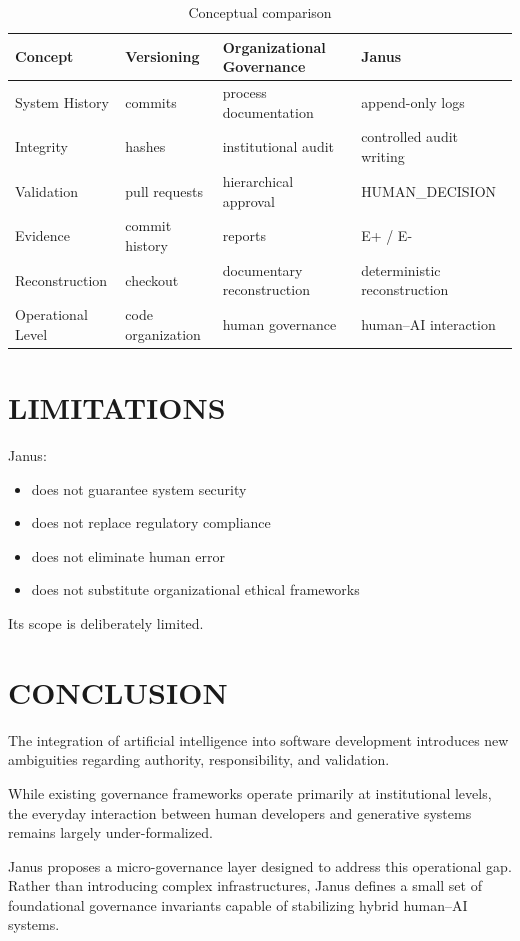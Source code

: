 \documentclass[conference]{IEEEtran}
\begin{document}
\begin{table}[ht]
\caption{Conceptual comparison}
\label{tab:comparison}
\centering
\setlength{\tabcolsep}{3pt}
\renewcommand{\arraystretch}{1.05}
\begin{tabularx}{\columnwidth}{l X X X}
\hline
Concept & Versioning & Organizational Governance & Janus \\
\hline
System History & commits & process documentation & append-only logs \\
Integrity & hashes & institutional audit & controlled audit writing \\
Validation & pull requests & hierarchical approval & HUMAN\_\allowbreak{}DECISION \\
Evidence & commit history & reports & E+ / E- \\
Reconstruction & checkout & documentary reconstruction & deterministic reconstruction \\
Operational Level & code organization & human governance & human–AI interaction \\
\hline
\end{tabularx}
\end{table}

\section{LIMITATIONS}
Janus:
\begin{itemize}
  \item does not guarantee system security
  \item does not replace regulatory compliance
  \item does not eliminate human error
  \item does not substitute organizational ethical frameworks
\end{itemize}

Its scope is deliberately limited.

\section{CONCLUSION}
The integration of artificial intelligence into software development introduces new ambiguities regarding authority, responsibility, and validation.

While existing governance frameworks operate primarily at institutional levels, the everyday interaction between human developers and generative systems remains largely under-formalized.

Janus proposes a micro-governance layer designed to address this operational gap. Rather than introducing complex infrastructures, Janus defines a small set of foundational governance invariants capable of stabilizing hybrid human--AI systems.
\end{document}
